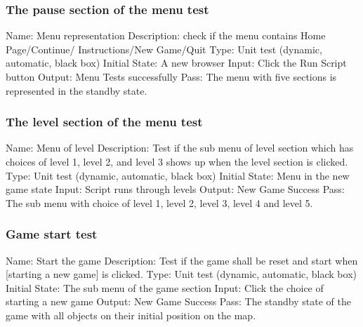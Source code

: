 \documentclass{article}
\begin{document}
\subsubsection{The pause section of the menu test}
Name:  Menu representation\newline
Description: check if the menu contains Home Page/Continue/
Instructions/New Game/Quit \newline
Type: Unit test (dynamic, automatic, black box) \newline
Initial State: A new browser \newline
Input: Click the Run Script button \newline
Output: Menu Tests successfully \newline
Pass: The menu with five sections is represented in the standby state. \newline

\subsubsection{The level section of the menu test}
Name:  Menu of level\newline
Description: Test if the sub menu of level section which has choices of level 
1, level 2, and level 3 shows up when the level section is clicked. \newline
Type: Unit test (dynamic, automatic, black box) \newline
Initial State: Menu in the new game state \newline
Input: Script runs through levels\newline
Output: New Game Success\newline
Pass: The sub menu with choice of level 1, level 2, level 3, level 4 and level 5. \newline

\subsubsection{Game start test}
Name:  Start the game\newline
Description: Test if the game shall be reset and start when [starting a new 
game] is clicked. \newline
Type: Unit test (dynamic, automatic, black box) \newline
Initial State:  The sub menu of the game section \newline
Input: Click the choice of starting a new game \newline
Output: New Game Success\newline
Pass: The standby state of the game with all objects on their initial position 
on the map. \newline
\end{document}
